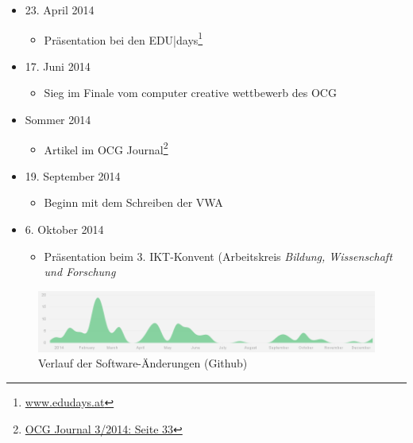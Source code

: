 \documentclass[12pt,a4paper,oneside]{scrartcl}
\begin{document}
\begin{multicols}{2}
\begin{itemize}
	\item 23. April 2014
	\begin{itemize}
		\item Präsentation bei den \textsf{EDU|days}\footnote{\href{http://www.edudays.at/}{www.edudays.at}}
	\end{itemize}
	\item 17. Juni 2014
	\begin{itemize}
		\item Sieg im Finale vom \textsf{computer creative wettbewerb} des OCG
	\end{itemize}
	\item Sommer 2014
	\begin{itemize}
		\item Artikel im OCG Journal\footnote{\href{http://www.ocg.at/sites/ocg.at/files/medien/pdfs/OCG-Journal1403.pdf}{OCG Journal 3/2014: Seite 33}}
	\end{itemize}
	\item 19. September 2014
	\begin{itemize}
		\item Beginn mit dem Schreiben der VWA
	\end{itemize}
	\item 6. Oktober 2014
	\begin{itemize}
		\item Präsentation beim 3. IKT-Konvent (Arbeitskreis \emph{Bildung, Wissenschaft und Forschung}
	\end{itemize}

\end{itemize}
\end{multicols}
\begin{figure}[h]
  \centering
     \includegraphics[width=\textwidth]{figures/github_verlauf}
  \caption*{Verlauf der Software-Änderungen (Github)}
  \label{fig:github}
\end{figure}
\end{document}

